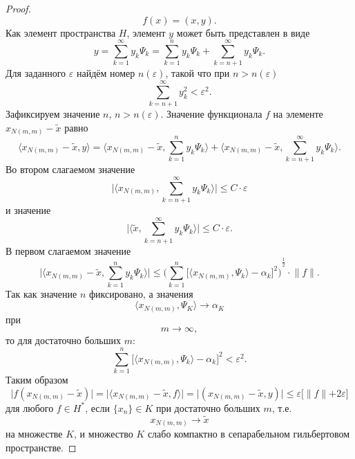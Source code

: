 \documentclass[12pt,a4paper,titlepage,oneside]{book}
\theoremstyle{definition}
\theoremstyle{plain}
\theoremstyle{break}
\theoremstyle{remark}
\theoremstyle{remark}
\theoremstyle{remark}
\theoremstyle{remark}
\theoremstyle{plain}
\theoremstyle{plain}
\begin{document}
\begin{proof}
\begin{equation*}
f(x)=(x,y).
\end{equation*}
Как элемент пространства $H$, элемент $y$ может быть представлен в виде 
\begin{equation*}
y=\sum\limits_{k=1}^\infty y_k\Psi_k =
\sum\limits_{k=1}^n y_k\Psi_k +
\sum\limits_{k=n+1}^\infty y_k\Psi_k.
\end{equation*}
Для заданного $\varepsilon$ найдём номер $n(\varepsilon)$, такой что при $n>n(\varepsilon)$
\begin{equation*}
\sum\limits_{k=n+1}^\infty y_k^2 < {\varepsilon}^2.
\end{equation*}
Зафиксируем значение $n$, $n>n(\varepsilon)$.
Значение функционала $f$ на элементе $x_{N(m,m)}-\widetilde{x}$ равно
\begin{equation*}
 \langle x_{N(m,m)}-\widetilde{x},y \rangle = 
 \langle x_{N(m,m)}-\widetilde{x},\sum\limits_{k=1}^n y_k\Psi_k \rangle +
 \langle x_{N(m,m)}-\widetilde{x},\sum\limits_{k=n+1}^\infty y_k\Psi_k \rangle.
\end{equation*}
Во втором слагаемом значение
\begin{equation*}
\big\vert  \langle x_{N(m,m)},\sum\limits_{k=n+1}^\infty y_k\Psi_k \rangle  \big\vert \leqslant
C\cdot\varepsilon
\end{equation*}
и значение 
\begin{equation*}
\big\vert  \langle \widetilde{x},\sum\limits_{k=n+1}^\infty y_k\Psi_k \rangle  \big\vert \leqslant
C\cdot\varepsilon.
\end{equation*}
В первом слагаемом значение
\begin{equation*}
\big\vert  \langle x_{N(m,m)}-\widetilde{x},
\sum\limits_{k=1}^n y_k\Psi_k \rangle  \big\vert \leqslant
{ \Big( \sum\limits_{k=1}^n{\big[ \langle x_{N(m,m)},\Psi_k \rangle  - \alpha_k \big]}^2 \Big) }^{\frac{1}{2}}\cdot
 \lVert f\lVert.
\end{equation*}
Так как значение $n$ фиксировано, а значения
$$\langle x_{N(m,m)},\Psi_K \rangle  \to \alpha_K$$
при
$$m\to\infty,$$
то для достаточно больших $m$:
\begin{equation*}
\sum\limits_{k=1}^n{ \big[ \langle x_{N(m,m)},\Psi_k \rangle  - \alpha_k \big]}^2 < \varepsilon^2.
\end{equation*}
Таким образом
\begin{equation*}
\big\vert f(x_{N(m,m)}-\widetilde{x}) \big\vert = \big\vert \langle x_{N(m,m)}-\widetilde{x},f \rangle \big\vert = \big\vert (x_{N(m,m)} -\widetilde{x},y) \big\vert \leqslant \varepsilon \big[ \lVert f\lVert + 2\varepsilon \big]
\end{equation*}
для любого $f \in H^*$, если
 $\lbrace x_n\rbrace \in K$ при достаточно больших $m$, т.е. 
\begin{equation*}
x_{N(m,m)} \to \widetilde{x}
\end{equation*}
на множестве $K$, и множество $K$ слабо компактно в сепарабельном гильбертовом пространстве.
\end{proof}
\end{document}

